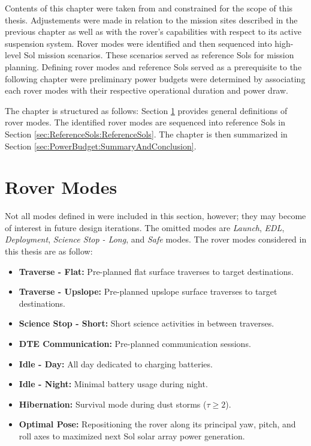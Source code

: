 Contents of this chapter were taken from  and constrained for the scope of this thesis. Adjustements were made in relation to the mission sites described in the previous chapter as well as with the rover's capabilities with respect to its active suspension system. Rover modes were identified and then sequenced into high-level Sol mission scenarios. These scenarios served as reference Sols for mission planning. Defining rover modes and reference Sols served as a prerequisite to the following chapter were preliminary power budgets were determined by associating each rover modes with their respective operational duration and power draw.

The chapter is structured as follows: Section \ref{sec:ReferenceSols:RoverModes} provides general definitions of rover modes. The identified rover modes are sequenced into reference Sols in Section \ref{sec:ReferenceSols:ReferenceSols}. The chapter is then summarized in Section \ref{sec:PowerBudget:SummaryAndConclusion}.

\section{Rover Modes}
\label{sec:ReferenceSols:RoverModes}
Not all modes defined in  were included in this section, however; they may become of interest in future design iterations. The omitted modes are \textit{Launch}, \textit{\ac{EDL}}, \textit{Deployment}, \textit{Science Stop - Long},  and \textit{Safe} modes. The rover modes considered in this thesis are as follow:

\begin{itemize}
    \item \textbf{Traverse - Flat:} Pre-planned flat surface traverses to target destinations.
    \item \textbf{Traverse - Upslope:} Pre-planned upslope surface traverses to target destinations.
    \item \textbf{Science Stop - Short:} Short science activities in between traverses.
    \item \textbf{\ac{DTE} Communication:} Pre-planned communication sessions.
    \item \textbf{Idle - Day:} All day dedicated to charging batteries.
    \item \textbf{Idle - Night:} Minimal battery usage during night.
    \item \textbf{Hibernation:} Survival mode during dust storms ($\tau \geq 2$).
    \item \textbf{Optimal Pose:} Repositioning the rover along its principal yaw, pitch, and roll axes to maximized next Sol solar array power generation.
\end{itemize}

